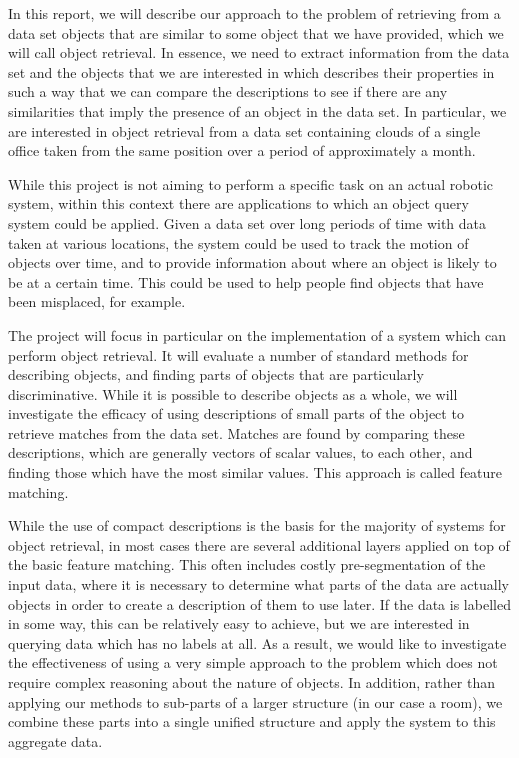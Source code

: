 \documentclass[11pt,a4paper]{kth-mag}
\begin{document}
In this report, we will describe our approach to the problem of retrieving from
a data set objects that are similar to some object that we have provided, which
we will call object retrieval. In essence, we need to extract information from
the data set and the objects that we are interested in which describes their
properties in such a way that we can compare the descriptions to see if there
are any similarities that imply the presence of an object in the data set. In
particular, we are interested in object retrieval from a data set containing
clouds of a single office taken from the same position over a period of
approximately a month.

While this project is not aiming to perform a specific task on an actual robotic
system, within this context there are applications to which an object query
system could be applied. Given a data set over long periods of time with data
taken at various locations, the system could be used to track the motion of
objects over time, and to provide information about where an object is likely to
be at a certain time. This could be used to help people find objects that have
been misplaced, for example.

The project will focus in particular on the implementation of a system which can
perform object retrieval. It will evaluate a number of standard methods for
describing objects, and finding parts of objects that are particularly
discriminative. While it is possible to describe objects as a whole, we will
investigate the efficacy of using descriptions of small parts of the object to
retrieve matches from the data set. Matches are found by comparing these
descriptions, which are generally vectors of scalar values, to each other, and
finding those which have the most similar values. This approach is called
feature matching.

While the use of compact descriptions is the basis for the majority of systems
for object retrieval, in most cases there are several additional layers applied
on top of the basic feature matching. This often includes costly
pre-segmentation of the input data, where it is necessary to determine what
parts of the data are actually objects in order to create a description of them
to use later. If the data is labelled in some way, this can be relatively easy
to achieve, but we are interested in querying data which has no labels at all.
As a result, we would like to investigate the effectiveness of using a very
simple approach to the problem which does not require complex reasoning about
the nature of objects. In addition, rather than applying our methods to
sub-parts of a larger structure (in our case a room), we combine these parts
into a single unified structure and apply the system to this aggregate data.
\end{document}
